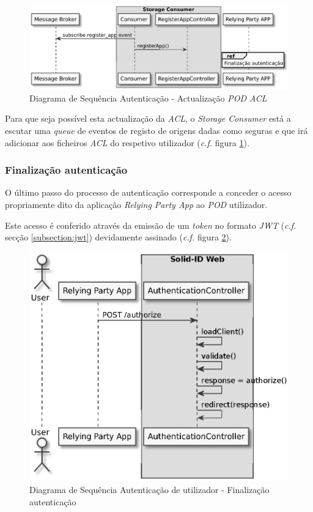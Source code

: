 \begin{figure}[H]
    \begin{center}
    \includegraphics[height=0.3 \textwidth]{figures/authentication_sd_3.eps}
    \caption{Diagrama de Sequência Autenticação - Actualização \emph{\acrshort{POD} \acrshort{ACL}}}
    \label{autenticacao_sd3}
    \end{center}
\end{figure}

Para que seja possível esta actualização da \emph{\acrshort{ACL}}, o \emph{Storage Consumer} está a escutar uma \emph{queue} de eventos de registo de origens dadas como seguras e que irá adicionar aos ficheiros \emph{\acrshort{ACL}} do respetivo utilizador (\emph{c.f.} figura \ref{autenticacao_sd3}).

\subsubsection{Finalização autenticação}
O último passo do processo de autenticação corresponde a conceder o acesso propriamente dito da aplicação \emph{Relying Party App} ao \emph{\acrshort{POD}} utilizador.

Este acesso é conferido através da emissão de um \emph{token} no formato \emph{\acrshort{JWT}} (\emph{c.f.} secção \ref{subsection:jwt}) devidamente assinado (\emph{c.f.} figura \ref{autenticacao_sd4}).

\begin{figure}[H]
    \begin{center}
    \includegraphics[width=0.7 \textwidth]{figures/authentication_sd_4.eps}
    \caption{Diagrama de Sequência Autenticação de utilizador - Finalização autenticação}
    \label{autenticacao_sd4}
    \end{center}
\end{figure}

